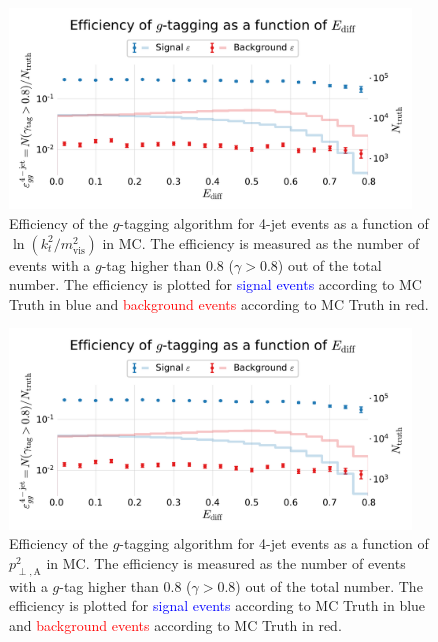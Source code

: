 \begin{figure}
  \centerfloat
  \includegraphics[width=0.95\textwidth, trim=10 10 10 50, clip, page=7]{figures/quarks/efficiency_events-down_sample=1.00-ML_vars=vertex-selection=b-ejet_min=4-n_iter_RS_lgb=99-n_iter_RS_xgb=9-cdot_cut=0.90-version=19-njet=4.pdf}
  \caption[$g$-Tagging Efficiency for 4-Jet Events in MC as a Function of $\ln \left( k_t^2 / m_\mathrm{vis}^2 \right)$]
          {Efficiency of the $g$-tagging algorithm for 4-jet events as a function of $\ln \left( k_t^2 / m_\mathrm{vis}^2 \right)$  in MC. The efficiency is measured as the number of events with a $g$-tag higher than 0.8 ($\gamma > 0.8$) out of the total number. The efficiency is plotted for \textcolor{blue}{signal events} according to MC Truth in blue and \textcolor{red}{background events} according to MC Truth in red.
          } 
  \label{fig:q:effiency_gtag_ln_kt_m_vis}
\end{figure}
\begin{figure}
  \centerfloat
  \includegraphics[width=0.95\textwidth, trim=10 10 10 50, clip, page=8]{figures/quarks/efficiency_events-down_sample=1.00-ML_vars=vertex-selection=b-ejet_min=4-n_iter_RS_lgb=99-n_iter_RS_xgb=9-cdot_cut=0.90-version=19-njet=4.pdf}
  \caption[$g$-Tagging Efficiency for 4-Jet Events in MC as a Function of $p^2_{\perp,\mathrm{A}}$]
          {Efficiency of the $g$-tagging algorithm for 4-jet events as a function of $p^2_{\perp,\mathrm{A}}$  in MC. The efficiency is measured as the number of events with a $g$-tag higher than 0.8 ($\gamma > 0.8$) out of the total number. The efficiency is plotted for \textcolor{blue}{signal events} according to MC Truth in blue and \textcolor{red}{background events} according to MC Truth in red.
          } 
  \label{fig:q:effiency_gtag_pt_antenna}
\end{figure}
